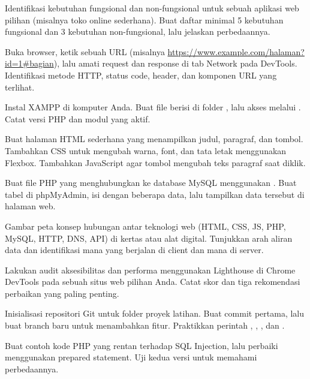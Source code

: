 \documentclass[../main.tex]{subfiles}
\begin{document}
\begin{aktivitas}
  \item Identifikasi kebutuhan fungsional dan non-fungsional untuk sebuah aplikasi web pilihan (misalnya toko online sederhana). Buat daftar minimal 5 kebutuhan fungsional dan 3 kebutuhan non-fungsional, lalu jelaskan perbedaannya.
  \item Buka browser, ketik sebuah URL (misalnya \url{https://www.example.com/halaman?id=1#bagian}), lalu amati request dan response di tab Network pada DevTools. Identifikasi metode HTTP, status code, header, dan komponen URL yang terlihat.
  \item Instal XAMPP di komputer Anda. Buat file  berisi  di folder , lalu akses melalui . Catat versi PHP dan modul yang aktif.
  \item Buat halaman HTML sederhana yang menampilkan judul, paragraf, dan tombol. Tambahkan CSS untuk mengubah warna, font, dan tata letak menggunakan Flexbox. Tambahkan JavaScript agar tombol mengubah teks paragraf saat diklik.
  \item Buat file PHP yang menghubungkan ke database MySQL menggunakan . Buat tabel  di phpMyAdmin, isi dengan beberapa data, lalu tampilkan data tersebut di halaman web.
  \item Gambar peta konsep hubungan antar teknologi web (HTML, CSS, JS, PHP, MySQL, HTTP, DNS, API) di kertas atau alat digital. Tunjukkan arah aliran data dan identifikasi mana yang berjalan di client dan mana di server.
  \item Lakukan audit aksesibilitas dan performa menggunakan Lighthouse di Chrome DevTools pada sebuah situs web pilihan Anda. Catat skor dan tiga rekomendasi perbaikan yang paling penting.
  \item Inisialisasi repositori Git untuk folder proyek latihan. Buat commit pertama, lalu buat branch baru untuk menambahkan fitur. Praktikkan perintah , , , dan .
  \item Buat contoh kode PHP yang rentan terhadap SQL Injection, lalu perbaiki menggunakan prepared statement. Uji kedua versi untuk memahami perbedaannya.
\end{aktivitas}
\end{document}
